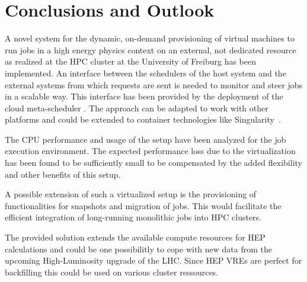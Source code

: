 \section{Conclusions and Outlook}








A novel system for the dynamic, on-demand provisioning of virtual machines to run jobs
in a high energy physics context on an external, not dedicated resource as
realized at the HPC cluster \NEMO at the University of Freiburg has been
implemented. An interface between the schedulers of the
host system and the external systems from which requests are sent is needed to
monitor and steer jobs in a scalable way.
This interface has been provided by the deployment of the cloud meta-scheduler \Roced.
The approach can be adapted to work with other platforms and could be extended to
container technologies like Singularity~\cite{VRE2017}.

The CPU performance and usage of the setup have been analyzed for the job execution environment.
The expected performance loss due to the virtualization has been found to be
sufficiently small to be compensated by the added flexibility and other benefits
of this setup.

A possible extension of such a virtualized setup is the provisioning of functionalities
for snapshots and migration of jobs. This would facilitate the efficient integration of
long-running monolithic jobs into HPC clusters.

The provided solution extends the available compute resources for HEP calculations
and could be one possibilitly to cope with new data from the upcoming High-Luminosity
upgrade of the LHC. Since HEP VREs are perfect for backfilling this could be used on various
cluster ressources.











